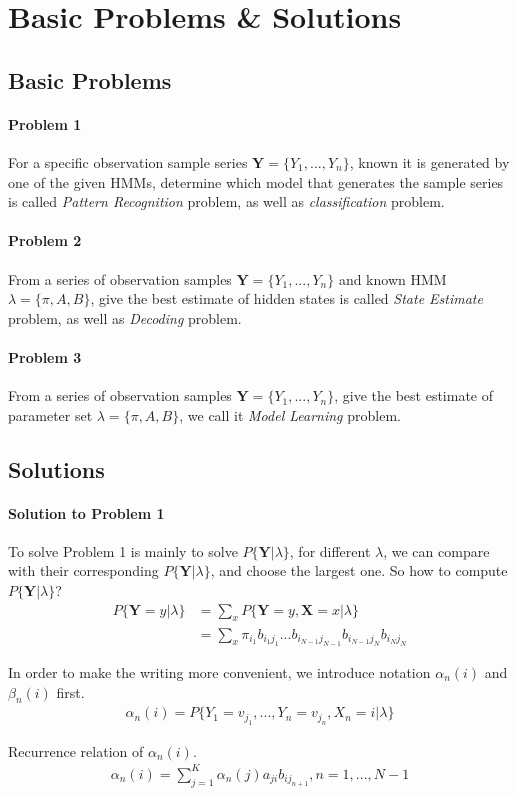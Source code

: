 \documentclass[runningheads]{llncs}
\begin{document}
\section{Basic Problems \& Solutions}
\subsection{Basic Problems}
\paragraph{Problem 1}
For a specific observation sample series $\mathbf{Y} = \{ Y_1, ..., Y_n \} $,
known it is generated by one of the given HMMs, determine which model that generates the 
sample series is called \emph{Pattern Recognition} problem, as well as \emph{classification} problem.
\paragraph{Problem 2}
From a series of observation samples $\mathbf{Y} = \{ Y_1, ..., Y_n \} $ and known HMM
$\lambda = \{ \pi, A, B \} $, give the best estimate of hidden states is called \emph{State Estimate}
problem, as well as \emph{Decoding} problem.
\paragraph{Problem 3}
From a series of observation samples $\mathbf{Y} = \{ Y_1, ..., Y_n \} $,
give the best estimate of parameter set $\lambda = \{ \pi, A, B \} $,
we call it \emph{Model Learning} problem.

\subsection{Solutions}

\paragraph{Solution to Problem 1}
To solve Problem 1 is mainly to solve $P \{ \mathbf{Y} | \lambda \} $,
for different $\lambda$, we can compare with their corresponding
$P \{ \mathbf{Y} | \lambda \} $, and choose the largest one.
So how to compute $P \{ \mathbf{Y} | \lambda \} $?
\begin{align}
    P \{ \mathbf{Y} = y | \lambda \}
    &= \sum_x P \{ \mathbf{Y} = y, \mathbf{X} = x | \lambda \} \\
    &= \sum_x \pi_{i_1} b_{i_1 j_1}... b_{i_{N-1} j_{N-1}} b_{i_{N-1} j_{N}} b_{i_{N} j_{N}}
\end{align}
\par
In order to make the writing more convenient, we introduce notation
$\alpha_n(i)$ and $\beta_n(i)$ first.
\begin{align}
    \alpha_n(i) = P \{ Y_1 = v_{j_1},..., Y_n = v_{j_n}, X_n = i | \lambda \}
\end{align}
\par
Recurrence relation of $\alpha_n(i)$.
\begin{align}
    \alpha_n(i) = \sum_{j=1}^K \alpha_n(j) a_{ji} b_{ij_{n+1}}, n = 1,..., N - 1
\end{align}
\end{document}
